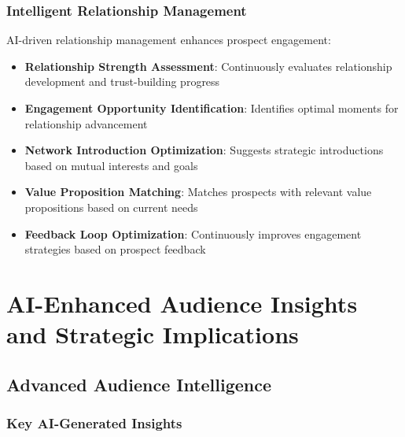 \subsubsection{Intelligent Relationship Management}

AI-driven relationship management enhances prospect engagement:

\begin{itemize}
    \item \textbf{Relationship Strength Assessment}: Continuously evaluates relationship development and trust-building progress
    \item \textbf{Engagement Opportunity Identification}: Identifies optimal moments for relationship advancement
    \item \textbf{Network Introduction Optimization}: Suggests strategic introductions based on mutual interests and goals
    \item \textbf{Value Proposition Matching}: Matches prospects with relevant value propositions based on current needs
    \item \textbf{Feedback Loop Optimization}: Continuously improves engagement strategies based on prospect feedback
\end{itemize}

\section{AI-Enhanced Audience Insights and Strategic Implications}

\subsection{Advanced Audience Intelligence}

\subsubsection{Key AI-Generated Insights}

